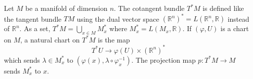 Let $M$ be a manifold of dimension $n$. The cotangent bundle $T^*M$ is defined like the tangent bundle $TM$ using the dual vector space $(\mathbb{R}^n)^* = L(\mathbb{R}^n, \mathbb{R})$ instead of $\mathbb{R}^n$. As a set, $T^*M = \bigcup_{x \in M} M_x^*$ where $M_x^* = L(M_x, \mathbb{R})$. If $(\varphi, U)$ is a chart on $M$, a natural chart on $T^*M$ is the map
$$T^*U \to \varphi(U) \times (\mathbb{R}^n)^*$$
which sends $\lambda \in M_x^*$ to $(\varphi(x), \lambda \circ \varphi_x^{-1})$. The projection map $p: T^*M \to M$ sends $M_x^*$ to $x$.
